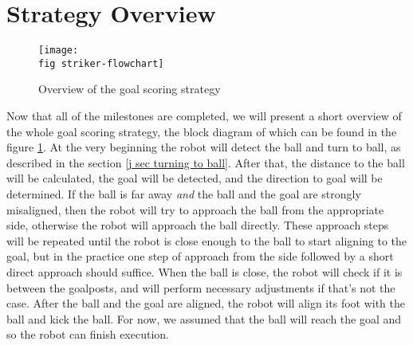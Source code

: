 \section{Strategy Overview}

\begin{figure}[ht]
  \texttt{[image: \\fig striker-flowchart]}
  \caption{Overview of the goal scoring strategy}
  \label{p figure strategy-overview}
\end{figure}

Now that all of the milestones are completed, we will present a short overview
of the whole goal scoring strategy, the block diagram of which can be found in
the figure \ref{p figure strategy-overview}. At the very beginning the robot
will detect the ball and turn to ball, as described in the section \ref{j sec
  turning to ball}. After that, the distance to the ball will be calculated,
the goal will be detected, and the direction to goal will be determined. If the
ball is far away \textit{and} the ball and the goal are strongly misaligned,
then the robot will try to approach the ball from the appropriate side,
otherwise the robot will approach the ball directly. These approach steps will
be repeated until the robot is close enough to the ball to start aligning to
the goal, but in the practice one step of approach from the side followed by a
short direct approach should suffice. When the ball is close, the robot will
check if it is between the goalposts, and will perform necessary adjustments if
that's not the case. After the ball and the goal are aligned, the robot will
align its foot with the ball and kick the ball. For now, we assumed that the
ball will reach the goal and so the robot can finish execution.
